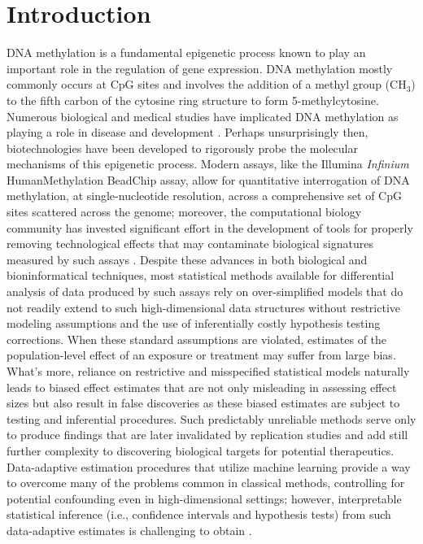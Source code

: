 \documentclass[9pt,a4paper,]{extarticle}
\theoremstyle{definition}
\theoremstyle{definition}
\theoremstyle{definition}
\theoremstyle{remark}
\begin{document}
\hypertarget{introduction}{%
\section{Introduction}\label{introduction}}

DNA methylation is a fundamental epigenetic process known to play an important
role in the regulation of gene expression. DNA methylation mostly commonly
occurs at CpG sites and involves the addition of a methyl group (\(\text{CH}_3\))
to the fifth carbon of the cytosine ring structure to form 5-methylcytosine.
Numerous biological and medical studies have implicated DNA methylation as
playing a role in disease and development \citep{robertson2005dna}. Perhaps
unsurprisingly then, biotechnologies have been developed to rigorously probe the
molecular mechanisms of this epigenetic process. Modern assays, like the
Illumina \emph{Infinium} HumanMethylation BeadChip assay, allow for quantitative
interrogation of DNA methylation, at single-nucleotide resolution, across a
comprehensive set of CpG sites scattered across the genome; moreover, the
computational biology community has invested significant effort in the
development of tools for properly removing technological effects that may
contaminate biological signatures measured by such assays
\citep[\citet{dedeurwaerder2013comprehensive}]{fortin2014functional}. Despite these
advances in both biological and bioninformatical techniques, most statistical
methods available for differential analysis of data produced by such assays rely
on over-simplified models that do not readily extend to such high-dimensional
data structures without restrictive modeling assumptions and the use of
inferentially costly hypothesis testing corrections. When these standard
assumptions are violated, estimates of the population-level effect of an
exposure or treatment may suffer from large bias. What's more, reliance on
restrictive and misspecified statistical models naturally leads to biased effect
estimates that are not only misleading in assessing effect sizes but also result
in false discoveries as these biased estimates are subject to testing and
inferential procedures. Such predictably unreliable methods serve only to
produce findings that are later invalidated by replication studies and add still
further complexity to discovering biological targets for potential therapeutics.
Data-adaptive estimation procedures that utilize machine learning provide a way
to overcome many of the problems common in classical methods, controlling for
potential confounding even in high-dimensional settings; however, interpretable
statistical inference (i.e., confidence intervals and hypothesis tests) from
such data-adaptive estimates is challenging to obtain \citep{libbrecht2015machine}.
\end{document}
